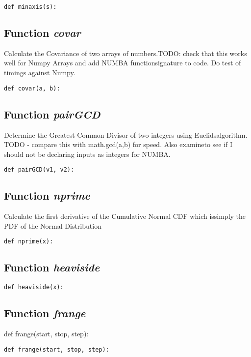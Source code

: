 \documentclass[twoside,11pt]{book}
\begin{document}
\begin{lstlisting}
def minaxis(s):
\end{lstlisting}

\subsection{Function {\it covar}}
Calculate the Covariance of two arrays of numbers.TODO: check that this works well for Numpy Arrays and add NUMBA functionsignature to code. Do test of timings against Numpy. 

\begin{lstlisting}
def covar(a, b):
\end{lstlisting}

\subsection{Function {\it pairGCD}}
Determine the Greatest Common Divisor of two integers using Euclidsalgorithm. TODO - compare this with math.gcd(a,b) for speed. Also examineto see if I should not be declaring inputs as integers for NUMBA. 

\begin{lstlisting}
def pairGCD(v1, v2):
\end{lstlisting}

\subsection{Function {\it nprime}}
Calculate the first derivative of the Cumulative Normal CDF which issimply the PDF of the Normal Distribution 

\begin{lstlisting}
def nprime(x):
\end{lstlisting}

\subsection{Function {\it heaviside}}


\begin{lstlisting}
def heaviside(x):
\end{lstlisting}

\subsection{Function {\it frange}}
def frange(start, stop, step):

\begin{lstlisting}
def frange(start, stop, step):
\end{lstlisting}
\end{document}
